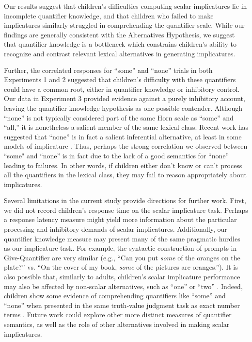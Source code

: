 \documentclass[man]{apa2}
\begin{document}
{Our results suggest that children's difficulties computing scalar implicatures lie in incomplete quantifier knowledge, and that children who failed to make implicatures similarly struggled in comprehending the quantifier scale. While our findings are generally consistent with the Alternatives Hypothesis, we suggest that quantifier knowledge is a bottleneck which constrains children's ability to recognize and contrast relevant lexical alternatives in generating implicatures.

Further, the correlated responses for ``some'' and ``none'' trials in both Experiments 1 and 2 suggested that children's difficulty with these quantifiers could have a common root, either in quantifier knowledge or inhibitory control. Our data in Experiment 3 provided evidence against a purely inhibitory account, leaving the quantifier knowledge hypothesis as one possible contender. Although ``none'' is not typically considered part of the same Horn scale as ``some'' and ``all,'' it is nonetheless a salient member of the same lexical class. Recent work has suggested that ``none'' is in fact a salient inferential alternative, at least in some models of implicature \cite{franke2014}. Thus, perhaps the strong correlation we observed between ``some" and ``none'' is in fact due to the lack of a good semantics for ``none'' leading to failures. In other words, if children either don't know or can't process all the quantifiers in the lexical class, they may fail to reason appropriately about implicatures.

Several limitations in the current study provide directions for further work. First, we did not record children's response time on the scalar implicature task. Perhaps a response latency measure might yield more information about the particular processing and inhibitory demands of scalar implicatures. Additionally, our quantifier knowledge measure \cite{barner2009} may present many of the same pragmatic hurdles as our implicature task. For example, the syntactic construction of prompts in Give-Quantifier are very similar (e.g., ``Can you put \emph{some} of the oranges on the plate?'' vs. ``On the cover of my book, \emph{some} of the pictures are oranges.''). It is also possible that, similarly to adults, children's scalar implicature performance may also be affected by non-scalar alternatives, such as ``one'' or ``two'' \cite{degen2015}. Indeed, children show some evidence of comprehending quantifiers like ``some'' and ``none'' when presented in the same truth-value judgment task as exact number terms \cite{barner2009}. Future work could explore other more distinct measures of quantifier semantics, as well as the role of other alternatives involved in making scalar implicatures.

}
\end{document}
